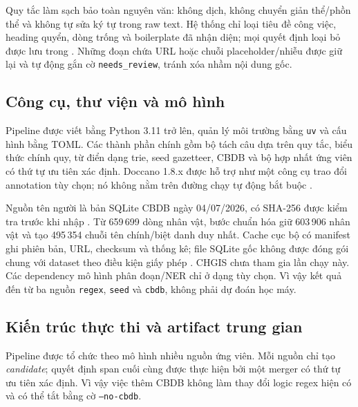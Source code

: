 \documentclass[11pt,a4paper]{article}
\begin{document}
Quy tắc làm sạch bảo toàn nguyên văn: không dịch, không chuyển giản thể/phồn
thể và không tự sửa ký tự trong raw text. Hệ thống chỉ loại tiêu đề công việc,
heading quyển, dòng trống và boilerplate đã nhận diện; mọi quyết định loại bỏ
được lưu trong . Những đoạn chứa URL hoặc
chuỗi placeholder/nhiễu được giữ lại và tự động gắn cờ
\texttt{needs\_review}, tránh xóa nhầm nội dung gốc.

\subsection{Công cụ, thư viện và mô hình}

Pipeline được viết bằng Python 3.11 trở lên, quản lý môi trường bằng \texttt{uv}
và cấu hình bằng TOML. Các thành phần chính gồm bộ tách câu dựa trên quy tắc,
biểu thức chính quy, từ điển dạng trie, seed gazetteer, CBDB và bộ hợp nhất ứng viên
có thứ tự ưu tiên xác định. Doccano 1.8.x được hỗ trợ như một công cụ trao đổi
annotation tùy chọn; nó không nằm trên đường chạy tự động bắt buộc
\cite{doccano}.

Nguồn tên người là bản SQLite CBDB ngày 04/07/2026, có SHA-256 được kiểm tra
trước khi nhập \cite{cbdbsqlite}. Từ 659\,699 dòng nhân vật, bước chuẩn hóa giữ 603\,906 nhân vật
và tạo 495\,354 chuỗi tên chính/biệt danh duy nhất. Cache cục bộ có manifest
ghi phiên bản, URL, checksum và thống kê; file SQLite gốc không được đóng gói
chung với dataset theo điều kiện giấy phép \cite{cbdblicense}. CHGIS chưa tham gia
lần chạy này. Các dependency mô hình
phân đoạn/NER chỉ ở dạng tùy chọn. Vì vậy kết quả đến từ ba nguồn
\texttt{regex}, \texttt{seed} và \texttt{cbdb}, không phải dự đoán học máy.

\subsection{Kiến trúc thực thi và artifact trung gian}

Pipeline được tổ chức theo mô hình nhiều nguồn ứng viên. Mỗi nguồn chỉ tạo
\emph{candidate}; quyết định span cuối cùng được thực hiện bởi một merger có
thứ tự ưu tiên xác định. Vì vậy việc thêm CBDB không làm thay đổi logic regex
hiện có và có thể tắt bằng cờ \texttt{--no-cbdb}.
\end{document}
